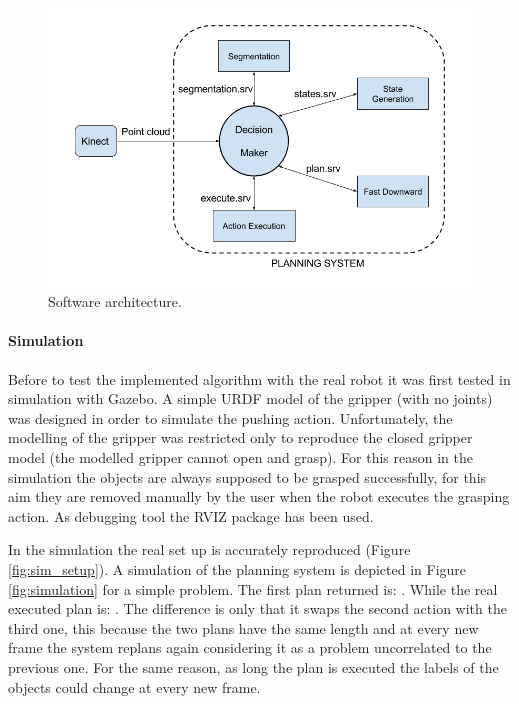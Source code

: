 \begin{figure}[h]
\centering
\includegraphics[width=14cm]{Img/software/Software_arquitecture.png}
\caption{Software architecture.}\label{fig:architecture}
\end{figure}


\paragraph{Simulation}
Before to test the implemented algorithm with the real robot it was first tested in simulation with Gazebo\citep{koenig2004design}. A simple URDF model of the gripper (with no joints) was designed in order to simulate the pushing action. Unfortunately, the modelling of the gripper was restricted only to reproduce the closed gripper model (the modelled gripper cannot open and grasp). For this reason in the simulation the objects are always supposed to be grasped successfully, for this aim they are removed manually by the user when the robot executes the grasping action. As debugging tool the RVIZ package\citep{RVIZ} has been used.  

In the simulation the real set up is accurately reproduced (Figure \ref{fig:sim_setup}). A simulation of the planning system is depicted in Figure \ref{fig:simulation} for a simple problem.
The first plan returned is: . While the real executed plan is: . The difference is only that it swaps the second action with the third one, this because the two plans have the same length and at every new frame the system replans again considering it as a problem uncorrelated to the previous one. For the same reason, as long the plan is executed the labels of the objects could change at every new frame. %

